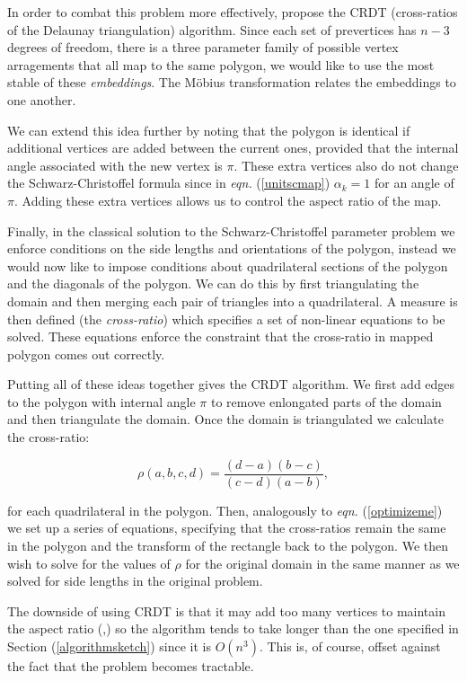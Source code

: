 \documentclass[a4paper,10pt]{amsart}
\newcommand{\sch}{Schwarz-Christoffel }
\newcommand{\eqn}[1]{\emph{eqn.} (\ref{#1})}
\begin{document}
In order to combat this problem more effectively, \cite{vavasis96} propose the CRDT (cross-ratios of the Delaunay triangulation) algorithm. Since each set of prevertices has $n-3$ degrees of freedom, there is a three parameter family of possible vertex arragements that all map to the same polygon, we would like to use the most stable of these \emph{embeddings}. The M\"{o}bius transformation relates the embeddings to one another.

We can extend this idea further by noting that the polygon is identical if additional vertices are added between the current ones, provided that the internal angle associated with the new vertex is $\pi$. These extra vertices also do not change the \sch formula since in \eqn{unitscmap} $\alpha_k=1$ for an angle of $\pi$. Adding these extra vertices allows us to control the aspect ratio of the map.

Finally, in the classical solution to the \sch parameter problem we enforce conditions on the side lengths and orientations of the polygon, instead we would now like to impose conditions about quadrilateral sections of the polygon and the diagonals of the polygon. We can do this by first triangulating the domain and then merging each pair of triangles into a quadrilateral. A measure is then defined (the \emph{cross-ratio}) which specifies a set of non-linear equations to be solved. These equations enforce the constraint that the cross-ratio in mapped polygon comes out correctly. 

Putting all of these ideas together gives the CRDT algorithm. We first add edges to the polygon with internal angle $\pi$ to remove enlongated parts of the domain and then triangulate the domain. Once the domain is triangulated we calculate the cross-ratio:

\begin{equation}
\rho(a,b,c,d) = \frac{(d-a)(b-c)}{(c-d)(a-b)},
\end{equation}

for each quadrilateral in the polygon. Then, analogously to \eqn{optimizeme} we set up a series of equations, specifying that the cross-ratios remain the same in the polygon and the transform of the rectangle back to the polygon. We then wish to solve for the values of $\rho$ for the original domain in the same manner as we solved for side lengths in the original problem. 

The downside of using CRDT is that it may add too many vertices to maintain the aspect ratio (\cite{driscoll05},) so the algorithm tends to take longer than the one specified in Section (\ref{algorithmsketch}) since it is $O(n^3)$. This is, of course, offset against the fact that the problem becomes tractable.



\end{document}
